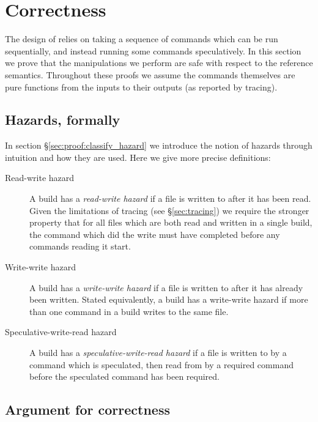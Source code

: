 \newcommand{\claim}{\noindent Claim: }
\renewcommand{\proof}{\vspace{1mm}\noindent Proof: }
\newcommand{\refutation}{\vspace{1mm}\noindent Refutation: }

\section{Correctness}
\label{sec:proof}

The design of \Rattle relies on taking a sequence of commands which can be run sequentially, and instead running some commands speculatively. In this section we prove that the manipulations we perform are safe with respect to the reference semantics. Throughout these proofs we assume the commands themselves are pure functions from the inputs to their outputs (as reported by tracing).

\subsection{Hazards, formally}
\label{sec:hazards_formally}

In section \S\ref{sec:proof:classify_hazard} we introduce the notion of hazards through intuition and how they are used. Here we give more precise definitions:

\begin{description}
\item[Read-write hazard] A build has a \emph{read-write hazard} if a file is written to after it has been read. Given the limitations of tracing (see \S\ref{sec:tracing}) we require the stronger property that for all files which are both read and written in a single build, the command which did the write must have completed before any commands reading it start.
\item[Write-write hazard] A build has a \emph{write-write hazard} if a file is written to after it has already been written. Stated equivalently, a build has a write-write hazard if more than one command in a build writes to the same file.
\item[Speculative-write-read hazard] A build has a \emph{speculative-write-read hazard} if a file is written to by a command which is speculated, then read from by a required command before the speculated command has been required.
\end{description}

\subsection{Argument for correctness}
\label{sec:argument}

